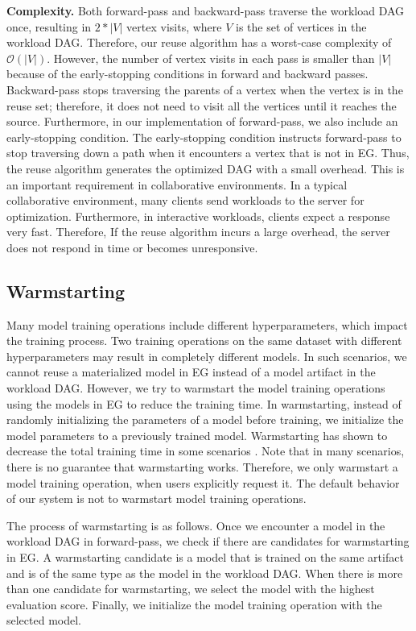 \textbf{Complexity.} 
Both forward-pass and backward-pass traverse the workload DAG once, resulting in $2*|V|$ vertex visits, where $V$ is the set of vertices in the workload DAG.
Therefore, our reuse algorithm has a worst-case complexity of $\mathcal{O}(|V|)$.
However, the number of vertex visits in each pass is smaller than $|V|$ because of the early-stopping conditions in forward and backward passes.
Backward-pass stops traversing the parents of a vertex when the vertex is in the reuse set; therefore, it does not need to visit all the vertices until it reaches the source.
Furthermore, in our implementation of forward-pass, we also include an early-stopping condition.
The early-stopping condition instructs forward-pass to stop traversing down a path when it encounters a vertex that is not in EG.
Thus, the reuse algorithm generates the optimized DAG with a small overhead.
This is an important requirement in collaborative environments.
In a typical collaborative environment, many clients send workloads to the server for optimization.
Furthermore, in interactive workloads, clients expect a response very fast.
Therefore, If the reuse algorithm incurs a large overhead, the server does not respond in time or becomes unresponsive.
\subsection{Warmstarting}
Many model training operations include different hyperparameters, which impact the training process.
Two training operations on the same dataset with different hyperparameters may result in completely different models.
In such scenarios, we cannot reuse a materialized model in EG instead of a model artifact in the workload DAG.
However, we try to warmstart the model training operations using the models in EG to reduce the training time.
In warmstarting, instead of randomly initializing the parameters of a model before training, we initialize the model parameters to a previously trained model.
Warmstarting has shown to decrease the total training time in some scenarios \cite{baylor2017tfx}.
Note that in many scenarios, there is no guarantee that warmstarting works.
Therefore, we only warmstart a model training operation, when users explicitly request it.
The default behavior of our system is not to warmstart model training operations.

The process of warmstarting is as follows.
Once we encounter a model in the workload DAG in forward-pass, we check if there are candidates for warmstarting in EG.
A warmstarting candidate is a model that is trained on the same artifact and is of the same type as the model in the workload DAG.
When there is more than one candidate for warmstarting, we select the model with the highest evaluation score.
Finally, we initialize the model training operation with the selected model.